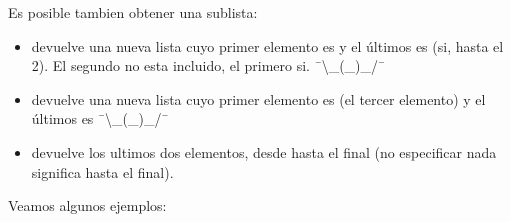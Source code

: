 \documentclass[a5paper,9pt,spanish]{sphinxmanual}
\begin{document}
\sphinxAtStartPar
Es posible tambien obtener una sublista:
\begin{itemize}
\item {} 
\sphinxAtStartPar
{} devuelve una nueva lista cuyo primer elemento es
 y el últimos es  (si, hasta
el 2). El segundo  no esta incluido, el primero si. ¯\textbackslash{}\_(\sphinxhyphen{}\_\sphinxhyphen{})\_/¯

\item {} 
\sphinxAtStartPar
{} devuelve una nueva lista cuyo primer elemento es
 (el tercer elemento) y el últimos es
 ¯\textbackslash{}\_(\sphinxhyphen{}\_\sphinxhyphen{})\_/¯

\item {} 
\sphinxAtStartPar
{} devuelve los ultimos dos elementos, desde
 hasta el final (no especificar nada significa hasta
el final).

\end{itemize}

\sphinxAtStartPar
Veamos algunos ejemplos:
\end{document}
